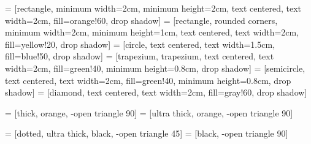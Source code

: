 \usepackage{tikz}
\usetikzlibrary{calc}
\usetikzlibrary{fit}
\usetikzlibrary{shapes}
\usetikzlibrary{positioning}
\usetikzlibrary{matrix, backgrounds, arrows, shadows}


 = [rectangle, minimum width=2cm, minimum height=2cm, text centered, text width=2cm, fill=orange!60, drop shadow]
 = [rectangle, rounded corners, minimum width=2cm, minimum height=1cm, text centered, text width=2cm, fill=yellow!20, drop shadow]
 = [circle, text centered, text width=1.5cm, fill=blue!50, drop shadow]
 = [trapezium, trapezium, text centered, text width=2cm, fill=green!40, minimum height=0.8cm, drop shadow]
 = [semicircle, text centered, text width=2cm, fill=green!40, minimum height=0.8cm, drop shadow]
 = [diamond, text centered, text width=2cm, fill=gray!60, drop shadow]

 = [thick, orange, -open triangle 90]
 = [ultra thick, orange, -open triangle 90]

 = [dotted, ultra thick, black, -open triangle 45]
 = [black, -open triangle 90]